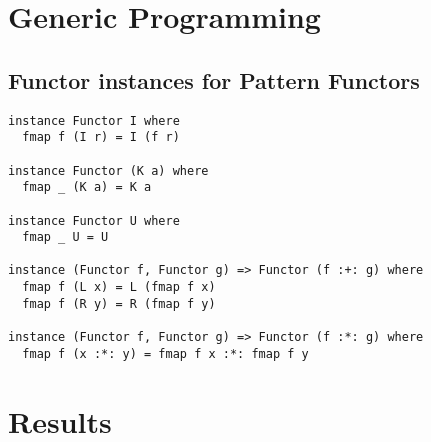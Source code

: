 \appendix
\chapter{Generic Programming}
\section{Functor instances for Pattern Functors}
\label{app-inst-functor-patfun}
\begin{verbatim}
instance Functor I where
  fmap f (I r) = I (f r)

instance Functor (K a) where
  fmap _ (K a) = K a

instance Functor U where
  fmap _ U = U

instance (Functor f, Functor g) => Functor (f :+: g) where
  fmap f (L x) = L (fmap f x)
  fmap f (R y) = R (fmap f y)

instance (Functor f, Functor g) => Functor (f :*: g) where
  fmap f (x :*: y) = fmap f x :*: fmap f y
\end{verbatim}

\chapter{Results}

\newcommand{\individualbenchmark}[2]{
  \begin{minipage}{.5\textwidth}
    \centering
    \texttt{[image: \#1]}
    \caption{#2}
  \end{minipage}
}

\newcommand{\trendlinebenchmark}[2]{
  \begin{figure}[H]
    \individualbenchmark
      {plots/run-3/time/#1/10/#2/cata_sum.pdf}
      {Execution Time - Cata Sum}
    \individualbenchmark
      {plots/run-3/time/#1/10/#2/generic_cata_sum.pdf}
      {Execution Time - Generic Cata Sum}  
  \end{figure}
  \begin{figure}[H]
    \individualbenchmark
      {plots/run-3/time/#1/10/#2/incremental_cata_sum.pdf}
      {Execution Time - Incremental Cata Sum}
    \individualbenchmark
      {plots/run-3/memory/#1/10/#2/cata_sum.pdf}
      {Memory Usage - Cata Sum}
  \end{figure}
  \begin{figure}[H]
    \individualbenchmark
      {plots/run-3/memory/#1/10/#2/generic_cata_sum.pdf}
      {Memory Usage - Generic Cata Sum}
    \individualbenchmark
      {plots/run-3/memory/#1/10/#2/incremental_cata_sum.pdf}
      {Memory Usage - Incremental Cata Sum} 
  \end{figure}
}

